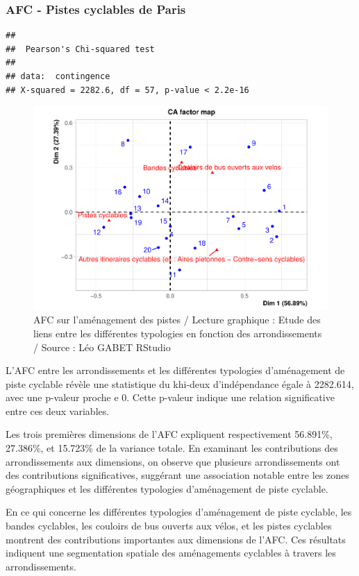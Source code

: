 \documentclass[french,]{compterendu}
\theoremstyle{urcastyle}
\theoremstyle{remark}
\begin{document}
\hypertarget{afc---pistes-cyclables-de-paris}{%
\subsubsection{AFC - Pistes cyclables de Paris}\label{afc---pistes-cyclables-de-paris}}

\begin{verbatim}
## 
##  Pearson's Chi-squared test
## 
## data:  contingence
## X-squared = 2282.6, df = 57, p-value < 2.2e-16
\end{verbatim}

\begin{figure}[H]

{\centering \includegraphics[width=0.9\linewidth]{Rapport_ADD_LEO-GABET_files/figure-latex/Afc5PARISvelo-1} 

}

\caption{AFC sur l'aménagement des pistes / Lecture graphique : Etude des liens entre les différentes typologies en fonction des arrondissements / Source : Léo GABET RStudio}\label{fig:Afc5PARISvelo}
\end{figure}

L'AFC entre les arrondissements et les différentes typologies d'aménagement de piste cyclable révèle une statistique du khi-deux d'indépendance égale à 2282.614, avec une p-valeur proche e 0. Cette p-valeur indique une relation significative entre ces deux variables.

Les trois premières dimensions de l'AFC expliquent respectivement 56.891\%, 27.386\%, et 15.723\% de la variance totale. En examinant les contributions des arrondissements aux dimensions, on observe que plusieurs arrondissements ont des contributions significatives, suggérant une association notable entre les zones géographiques et les différentes typologies d'aménagement de piste cyclable.

En ce qui concerne les différentes typologies d'aménagement de piste cyclable, les bandes cyclables, les couloirs de bus ouverts aux vélos, et les pistes cyclables montrent des contributions importantes aux dimensions de l'AFC. Ces résultats indiquent une segmentation spatiale des aménagements cyclables à travers les arrondissements.



\pagebreak
\listoffigures
\end{document}
